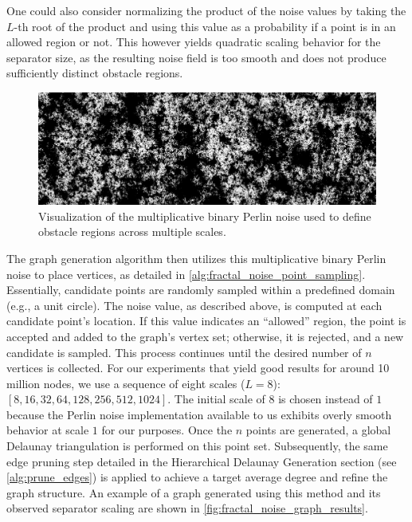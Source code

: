 One could also consider normalizing the product of the noise values by taking the \(L\)-th root of the product and using this value as a probability if a point is in an allowed region or not.
This however yields quadratic scaling behavior for the separator size, as the resulting noise field is too smooth and does not produce sufficiently distinct obstacle regions.

\begin{figure}[tbhp]
	\centering
	\includegraphics[width=\linewidth]{graphics/noise_image.png}
	\caption{Visualization of the multiplicative binary Perlin noise used to define obstacle regions across multiple scales.}
	\label{fig:multiplicative_binary_noise_viz}
\end{figure}

The graph generation algorithm then utilizes this multiplicative binary Perlin noise to place vertices, as detailed in \cref{alg:fractal_noise_point_sampling}.
Essentially, candidate points are randomly sampled within a predefined domain (e.g., a unit circle).
The noise value, as described above, is computed at each candidate point's location. If this value indicates an \enquote{allowed} region, the point is accepted and added to the graph's vertex set; otherwise, it is rejected, and a new candidate is sampled. This process continues until the desired number of \(n\) vertices is collected.
For our experiments that yield good results for around 10 million nodes, we use a sequence of eight scales (\(L=8\)): \([8, 16, 32, 64, 128, 256, 512, 1024]\). The initial scale of \(8\) is chosen instead of \(1\) because the Perlin noise implementation available to us exhibits overly smooth behavior at scale \(1\) for our purposes.
Once the \(n\) points are generated, a global Delaunay triangulation is performed on this point set. Subsequently, the same edge pruning step detailed in the Hierarchical Delaunay Generation section (see \cref{alg:prune_edges}) is applied to achieve a target average degree and refine the graph structure.
An example of a graph generated using this method and its observed separator scaling are shown in \cref{fig:fractal_noise_graph_results}.

